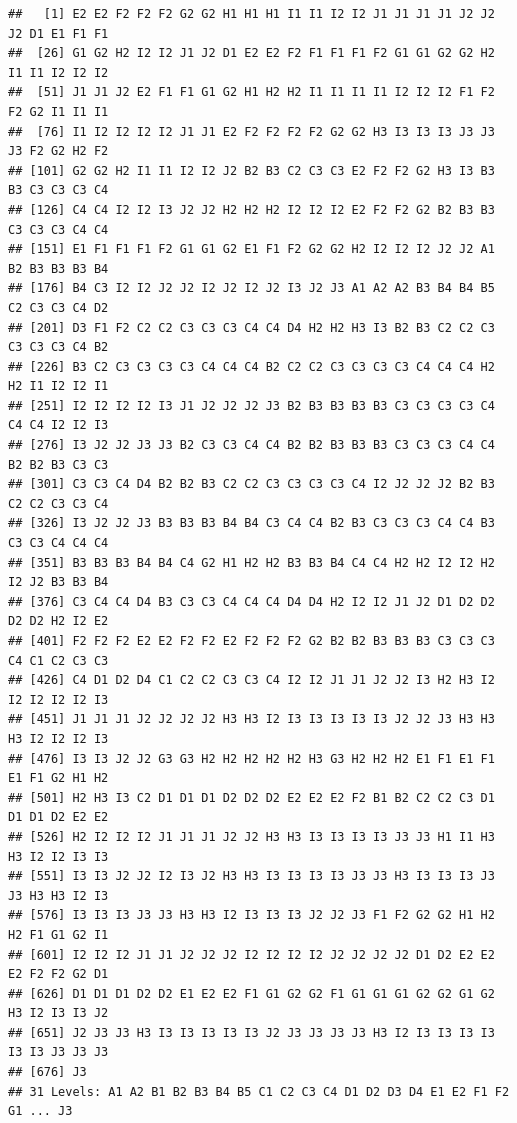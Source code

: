 \documentclass[
  spanish,
]{book}
\newenvironment{Shaded}{\begin{snugshade}}{\end{snugshade}}
\newcommand{\AttributeTok}[1]{\textcolor[rgb]{0.77,0.63,0.00}{#1}}
\newcommand{\ConstantTok}[1]{\textcolor[rgb]{0.00,0.00,0.00}{#1}}
\newcommand{\FunctionTok}[1]{\textcolor[rgb]{0.00,0.00,0.00}{#1}}
\newcommand{\NormalTok}[1]{#1}
\newcommand{\SpecialCharTok}[1]{\textcolor[rgb]{0.00,0.00,0.00}{#1}}
\newcommand{\StringTok}[1]{\textcolor[rgb]{0.31,0.60,0.02}{#1}}
\theoremstyle{break}
\theoremstyle{definition}
\theoremstyle{definition}
\theoremstyle{definition}
\theoremstyle{definition}
\theoremstyle{remark}
\begin{document}
\begin{verbatim}
##   [1] E2 E2 F2 F2 F2 G2 G2 H1 H1 H1 I1 I1 I2 I2 J1 J1 J1 J1 J2 J2 J2 D1 E1 F1 F1
##  [26] G1 G2 H2 I2 I2 J1 J2 D1 E2 E2 F2 F1 F1 F1 F2 G1 G1 G2 G2 H2 I1 I1 I2 I2 I2
##  [51] J1 J1 J2 E2 F1 F1 G1 G2 H1 H2 H2 I1 I1 I1 I1 I2 I2 I2 F1 F2 F2 G2 I1 I1 I1
##  [76] I1 I2 I2 I2 I2 J1 J1 E2 F2 F2 F2 F2 G2 G2 H3 I3 I3 I3 J3 J3 J3 F2 G2 H2 F2
## [101] G2 G2 H2 I1 I1 I2 I2 J2 B2 B3 C2 C3 C3 E2 F2 F2 G2 H3 I3 B3 B3 C3 C3 C3 C4
## [126] C4 C4 I2 I2 I3 J2 J2 H2 H2 H2 I2 I2 I2 E2 F2 F2 G2 B2 B3 B3 C3 C3 C3 C4 C4
## [151] E1 F1 F1 F1 F2 G1 G1 G2 E1 F1 F2 G2 G2 H2 I2 I2 I2 J2 J2 A1 B2 B3 B3 B3 B4
## [176] B4 C3 I2 I2 J2 J2 I2 J2 I2 J2 I3 J2 J3 A1 A2 A2 B3 B4 B4 B5 C2 C3 C3 C4 D2
## [201] D3 F1 F2 C2 C2 C3 C3 C3 C4 C4 D4 H2 H2 H3 I3 B2 B3 C2 C2 C3 C3 C3 C3 C4 B2
## [226] B3 C2 C3 C3 C3 C3 C4 C4 C4 B2 C2 C2 C3 C3 C3 C3 C4 C4 C4 H2 H2 I1 I2 I2 I1
## [251] I2 I2 I2 I2 I3 J1 J2 J2 J2 J3 B2 B3 B3 B3 B3 C3 C3 C3 C3 C4 C4 C4 I2 I2 I3
## [276] I3 J2 J2 J3 J3 B2 C3 C3 C4 C4 B2 B2 B3 B3 B3 C3 C3 C3 C4 C4 B2 B2 B3 C3 C3
## [301] C3 C3 C4 D4 B2 B2 B3 C2 C2 C3 C3 C3 C3 C4 I2 J2 J2 J2 B2 B3 C2 C2 C3 C3 C4
## [326] I3 J2 J2 J3 B3 B3 B3 B4 B4 C3 C4 C4 B2 B3 C3 C3 C3 C4 C4 B3 C3 C3 C4 C4 C4
## [351] B3 B3 B3 B4 B4 C4 G2 H1 H2 H2 B3 B3 B4 C4 C4 H2 H2 I2 I2 H2 I2 J2 B3 B3 B4
## [376] C3 C4 C4 D4 B3 C3 C3 C4 C4 C4 D4 D4 H2 I2 I2 J1 J2 D1 D2 D2 D2 D2 H2 I2 E2
## [401] F2 F2 F2 E2 E2 F2 F2 E2 F2 F2 F2 G2 B2 B2 B3 B3 B3 C3 C3 C3 C4 C1 C2 C3 C3
## [426] C4 D1 D2 D4 C1 C2 C2 C3 C3 C4 I2 I2 J1 J1 J2 J2 I3 H2 H3 I2 I2 I2 I2 I2 I3
## [451] J1 J1 J1 J2 J2 J2 J2 H3 H3 I2 I3 I3 I3 I3 I3 J2 J2 J3 H3 H3 H3 I2 I2 I2 I3
## [476] I3 I3 J2 J2 G3 G3 H2 H2 H2 H2 H2 H3 G3 H2 H2 H2 E1 F1 E1 F1 E1 F1 G2 H1 H2
## [501] H2 H3 I3 C2 D1 D1 D1 D2 D2 D2 E2 E2 E2 F2 B1 B2 C2 C2 C3 D1 D1 D1 D2 E2 E2
## [526] H2 I2 I2 I2 J1 J1 J1 J2 J2 H3 H3 I3 I3 I3 I3 J3 J3 H1 I1 H3 H3 I2 I2 I3 I3
## [551] I3 I3 J2 J2 I2 I3 J2 H3 H3 I3 I3 I3 I3 J3 J3 H3 I3 I3 I3 J3 J3 H3 H3 I2 I3
## [576] I3 I3 I3 J3 J3 H3 H3 I2 I3 I3 I3 J2 J2 J3 F1 F2 G2 G2 H1 H2 H2 F1 G1 G2 I1
## [601] I2 I2 I2 J1 J1 J2 J2 J2 I2 I2 I2 I2 J2 J2 J2 J2 D1 D2 E2 E2 E2 F2 F2 G2 D1
## [626] D1 D1 D1 D2 D2 E1 E2 E2 F1 G1 G2 G2 F1 G1 G1 G1 G2 G2 G1 G2 H3 I2 I3 I3 J2
## [651] J2 J3 J3 H3 I3 I3 I3 I3 I3 J2 J3 J3 J3 J3 H3 I2 I3 I3 I3 I3 I3 I3 J3 J3 J3
## [676] J3
## 31 Levels: A1 A2 B1 B2 B3 B4 B5 C1 C2 C3 C4 D1 D2 D3 D4 E1 E2 F1 F2 G1 ... J3
\end{verbatim}

\begin{Shaded}
\end{Shaded}
\end{document}
